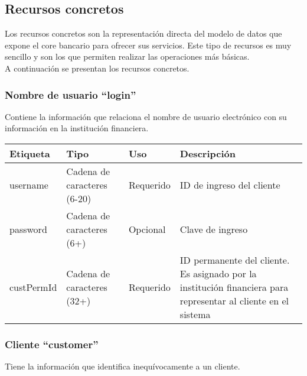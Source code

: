 \subsection{Recursos concretos}
Los recursos concretos son la representación directa del modelo de datos que expone el core bancario para ofrecer sus servicios. Este tipo de recursos es muy sencillo y son los que permiten realizar las operaciones más básicas. \\

A continuación se presentan los recursos concretos.

\subsubsection{Nombre de usuario ``login''}
Contiene la información que relaciona el nombre de usuario electrónico con su información  en la institución financiera.

\begin{center}
\begin{tabular}{|>{\centering\arraybackslash}p{}|>{\centering\arraybackslash}p{}|>{\centering\arraybackslash}p{}|>{\centering\arraybackslash}p{}|}
\hline 
\bfseries {Etiqueta} & \bfseries {Tipo} & \bfseries {Uso} & \bfseries {Descripción} \\ 
\hline 
username & Cadena de caracteres (6-20) & Requerido & ID de ingreso del cliente \\ 
\hline 
password & Cadena de caracteres (6+) & Opcional & Clave de ingreso \\ 
\hline 
custPermId & Cadena de caracteres (32+) & Requerido & ID permanente del cliente. Es asignado por la institución financiera para representar al cliente en el sistema \\ 
\hline 
\end{tabular}
\end{center}

\subsubsection{Cliente ``customer''}
Tiene la información que identifica inequívocamente a un cliente.


